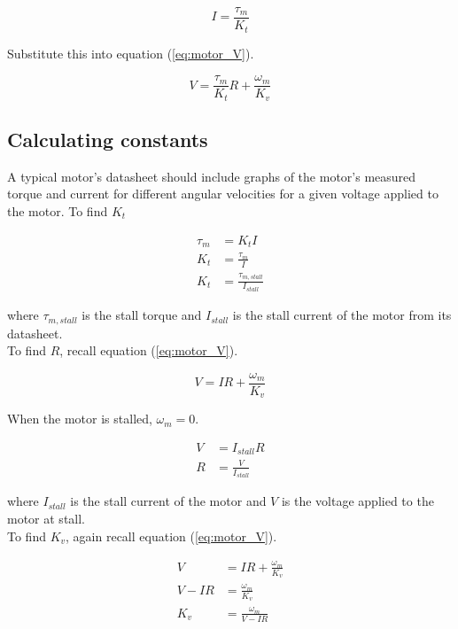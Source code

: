 \begin{equation*}
  I = \frac{\tau_m}{K_t}
\end{equation*}

\noindent Substitute this into equation (\ref{eq:motor_V}).

\begin{equation}
  V = \frac{\tau_m}{K_t} R + \frac{\omega_m}{K_v} \label{eq:motor_tau_V}
\end{equation}

\subsection{Calculating constants}

A typical motor's datasheet should include graphs of the motor's measured torque
and current for different angular velocities for a given voltage applied to the
motor. To find $K_t$

\begin{align}
  \tau_m &= K_t I \nonumber \\
  K_t &= \frac{\tau_m}{I} \nonumber \\
  K_t &= \frac{\tau_{m,stall}}{I_{stall}}
\end{align}

\noindent where $\tau_{m,stall}$ is the stall torque and $I_{stall}$ is the
stall current of the motor from its datasheet. \\

To find $R$, recall equation (\ref{eq:motor_V}).

\begin{equation*}
  V = IR + \frac{\omega_m}{K_v}
\end{equation*}

\noindent When the motor is stalled, $\omega_m = 0$.

\begin{align}
  V &= I_{stall} R \nonumber \\
  R &= \frac{V}{I_{stall}}
\end{align}

\noindent where $I_{stall}$ is the stall current of the motor and $V$ is the
voltage applied to the motor at stall. \\

To find $K_v$, again recall equation (\ref{eq:motor_V}).

\begin{align*}
  V &= IR + \frac{\omega_m}{K_v} \\
  V - IR &= \frac{\omega_m}{K_v} \\
  K_v &= \frac{\omega_m}{V - IR}
\end{align*}

